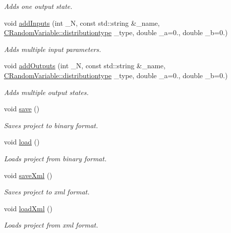 \begin{DoxyCompactItemize}
\begin{DoxyCompactList}\small\item\em Adds one output state. \end{DoxyCompactList}\item 
void \hyperlink{class_go_s_u_m_1_1_c_container_a5f4587ff5791f6d4d768b8e106f4532f}{add\-Inputs} (int \-\_\-\-N, const std\-::string \&\-\_\-name, \hyperlink{class_c_random_variable_a80d2a87c43847274138b51f7d713d7f1}{C\-Random\-Variable\-::distributiontype} \-\_\-type, double \-\_\-a=0., double \-\_\-b=0.)
\begin{DoxyCompactList}\small\item\em Adds multiple input parameters. \end{DoxyCompactList}\item 
void \hyperlink{class_go_s_u_m_1_1_c_container_a07ff088fd625a281e5c2f3056b5ab30b}{add\-Outputs} (int \-\_\-\-N, const std\-::string \&\-\_\-name, \hyperlink{class_c_random_variable_a80d2a87c43847274138b51f7d713d7f1}{C\-Random\-Variable\-::distributiontype} \-\_\-type, double \-\_\-a=0., double \-\_\-b=0.)
\begin{DoxyCompactList}\small\item\em Adds multiple output states. \end{DoxyCompactList}\item 
void \hyperlink{class_go_s_u_m_1_1_c_container_a323bfd6245970284c56d498135757358}{save} ()
\begin{DoxyCompactList}\small\item\em Saves project to binary format. \end{DoxyCompactList}\item 
void \hyperlink{class_go_s_u_m_1_1_c_container_a7e375679590b3e37935f2fb4ab632bb0}{load} ()
\begin{DoxyCompactList}\small\item\em Loads project from binary format. \end{DoxyCompactList}\item 
void \hyperlink{class_go_s_u_m_1_1_c_container_ad89e627b8c19bd1f65e102a81bcea993}{save\-Xml} ()
\begin{DoxyCompactList}\small\item\em Saves project to xml format. \end{DoxyCompactList}\item 
void \hyperlink{class_go_s_u_m_1_1_c_container_a594e74ec12b59375a61256c851b44529}{load\-Xml} ()
\begin{DoxyCompactList}\small\item\em Loads project from xml format. \end{DoxyCompactList}\item 

\end{DoxyCompactItemize}
